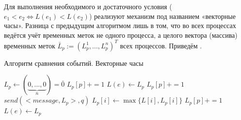 Для выполнения необходимого и достаточного условия ($e_1 < e_2 \Leftrightarrow L(e_1) < L(e_2)$) реализуют механизм под названием «векторные часы». Разница с предыдущим алгоритмом лишь в том, что во всех процессах ведётся учёт временных меток не одного процесса, а целого вектора (массива) временных меток $\bar{L}_p := (L_p^1, \ldots, L_p^n)^T$ всех процессов.
Приведём .
\begin{algorithm}
\caption{Алгоритм сравнения событий. Векторные часы}
\label{algComparisonVecClock}
\begin{algorithmic}
\State $L_p \gets (\underbrace{0,\ldots,0}_{n}) = \bar{0}$
 
    \State $L_p[p] += 1$
    \State $L(e) \gets L_p$ 
\EndIf
{}
    \State $L_p[p] += 1$
    \State $send(<message, L_p>, q)$ 
\EndIf
{}
        \State $L_p[i] \gets \max\{L[i],L_p[i]\}$
    \EndFor
    \State $L_p[p] += 1$
    \State $L(e) \gets L_p$
\EndIf
\EndFunction
\end{algorithmic}
\end{algorithm}

